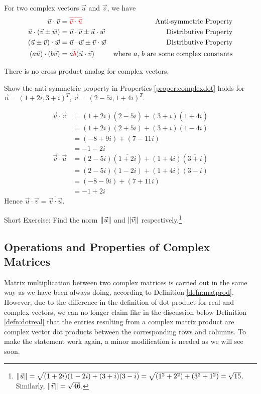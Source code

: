 \begin{proper}
\label{proper:complexdot}
For two complex vectors $\vec{u}$ and $\vec{v}$, we have
\begin{align*}
\vec{u} \cdot \vec{v} &= \textcolor{red}{\overline{\vec{v} \cdot \vec{u}}} &\text{Anti-symmetric Property} \\
\vec{u} \cdot (\vec{v} \pm \vec{w}) &= \vec{u} \cdot \vec{v} \pm \vec{u} \cdot \vec{w} &\text{Distributive Property} \\
(\vec{u} \pm \vec{v}) \cdot \vec{w} &= \vec{u} \cdot \vec{w} \pm \vec{v} \cdot \vec{w} &\text{Distributive Property} \\
(a\vec{u}) \cdot (b\vec{v}) &= a\textcolor{red}{\bar{b}}(\vec{u} \cdot \vec{v}) &\text{where $a$, $b$ are some complex constants}    
\end{align*}
\end{proper}
There is no cross product analog for complex vectors.
\begin{exmp}
Show the anti-symmetric property in Properties \ref{proper:complexdot} holds for $\vec{u} = (1+2i, 3+i)^T$, $\vec{v} = (2-5i, 1+4i)^T$.
\end{exmp}
\begin{solution}
\begin{align*}
\vec{u} \cdot \vec{v} &= (1+2i)(\overline{2-5i}) + (3+i)(\overline{1+4i}) \\
&= (1+2i)(2+5i) + (3+i)(1-4i) \\
&= (-8+9i) + (7-11i) \\
&= -1-2i 
\end{align*}
\begin{align*}
\vec{v} \cdot \vec{u} &= (2-5i)(\overline{1+2i}) + (1+4i)(\overline{3+i}) \\
&= (2-5i)(1-2i) + (1+4i)(3-i) \\
&= (-8-9i) + (7+11i) \\
&= -1+2i 
\end{align*}
Hence $\vec{u} \cdot \vec{v} = \overline{\vec{v} \cdot \vec{u}}$.
\end{solution}

Short Exercise: Find the norm $\norm{\vec{u}}$ and $\norm{\vec{v}}$ respectively.\footnote{$\norm{\vec{u}} = \sqrt{(1+2i)(1-2i) + (3+i)(3-i)} = \sqrt{(1^2 + 2^2) + (3^2 + 1^2)} = \sqrt{15}$. Similarly, $\norm{\vec{v}} = \sqrt{46}$.}

\subsection{Operations and Properties of Complex Matrices}
Matrix multiplication between two complex matrices is carried out in the same way as we have been always doing, according to Definition \ref{defn:matprod}. However, due to the difference in the definition of dot product for real and complex vectors, we can no longer claim like in the discussion below Definition \ref{defn:dotreal} that the entries resulting from a complex matrix product are complex vector dot products between the corresponding rows and columns. To make the statement work again, a minor modification is needed as we will see soon. 

